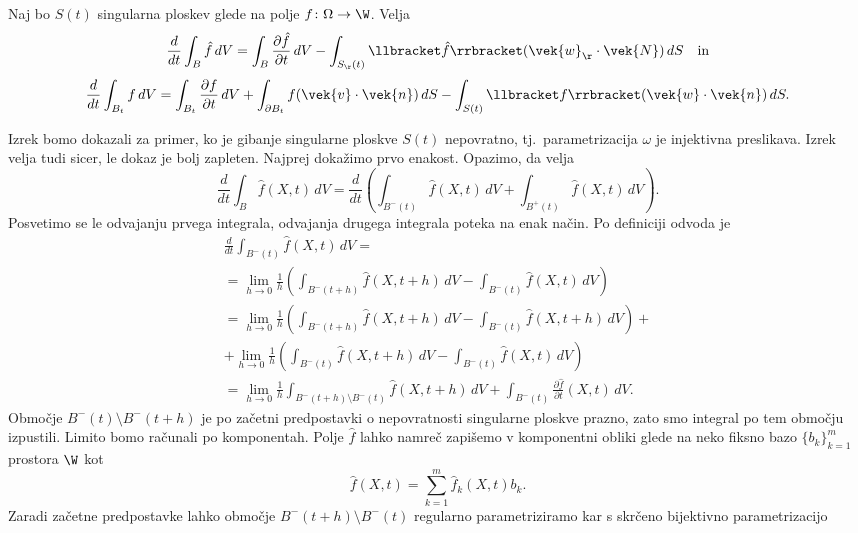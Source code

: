 
\begin{izrek}
	Naj bo $S(t)$ singularna ploskev glede na polje $f\colon\Omega\to\W$. Velja
	\begin{equation*}
		\frac{d}{dt}\int_B \hat{f}\,dV = \int_B \frac{\partial \hat{f}}{\partial t}\,dV -
		\int_{S_{\r}(t)} \llbracket\hat{f}\rrbracket(\vek{w}_{\r}\cdot\vek{N})\,dS\quad\textrm{in}
	\end{equation*}
	\[
		\frac{d}{dt}\int_{B_t} f\,dV = \int_{B_t} \frac{\partial f}{\partial t}\,dV +
		\int_{\partial B_t} f(\vek{v}\cdot\vek{n})\,dS - \int_{S(t)} \llbracket f\rrbracket(\vek{w}\cdot\vek{n})\,dS.
	\]
\end{izrek}
\proof
	Izrek bomo dokazali za primer, ko je gibanje singularne ploskve $S(t)$ nepovratno, tj.~parametrizacija
	$\omega$ je injektivna preslikava. Izrek velja tudi sicer, le dokaz je bolj zapleten.
	Najprej dokažimo prvo enakost. Opazimo, da velja
	\[
		\frac{d}{dt}\int_B \hat{f}(X,t)\,dV = \frac{d}{dt}\left(
		\int_{B^-(t)} \hat{f}(X,t)\,dV + \int_{B^+(t)} \hat{f}(X,t)\,dV \right).
	\]
	Posvetimo se le odvajanju prvega integrala, odvajanja drugega integrala poteka na enak način.
	Po definiciji odvoda je
	\begin{gather*}
		\frac{d}{dt}\int_{B^-(t)} \hat{f}(X,t)\,dV =\\ =\lim_{h\to 0} \frac{1}{h}\left(
		\int_{B^-(t+h)} \hat{f}(X,t+h)\,dV - \int_{B^-(t)} \hat{f}(X,t)\,dV \right) \\
		=\lim_{h\to 0} \frac{1}{h}\left( \int_{B^-(t+h)} \hat{f}(X,t+h)\,dV - \int_{B^-(t)} \hat{f}(X,t+h)\,dV \right) + \\
		+ \lim_{h\to 0} \frac{1}{h}\left( \int_{B^-(t)} \hat{f}(X,t+h)\,dV - \int_{B^-(t)} \hat{f}(X,t)\,dV \right) \\
		= \lim_{h\to 0} \frac{1}{h}\int_{B^-(t+h)\setminus B^-(t)} \hat{f}(X,t+h)\,dV +
		\int_{B^-(t)} \frac{\partial\hat{f}}{\partial t}(X,t)\,dV.
	\end{gather*}
	Območje $B^-(t)\setminus B^-(t+h)$ je po začetni predpostavki o nepovratnosti singularne ploskve prazno,
	zato smo integral po tem območju izpustili. Limito bomo računali po komponentah. Polje $\hat{f}$
	lahko namreč zapišemo v komponentni obliki glede na neko fiksno bazo $\{b_k\}_{k=1}^m$ prostora $\W$ kot
	\[ \hat{f}(X,t)=\sum_{k=1}^m \hat{f}_k(X,t)b_k. \]
	Zaradi začetne predpostavke lahko
	območje $B^-(t+h)\setminus B^-(t)$ regularno parametriziramo kar s skrčeno bijektivno parametrizacijo
